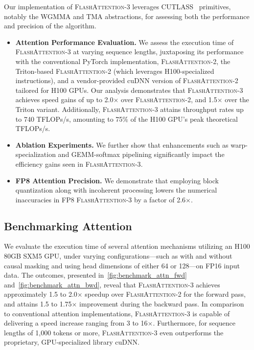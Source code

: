 Our implementation of \textsc{FlashAttention-3} leverages CUTLASS~\citep{Thakkar_CUTLASS_2023} primitives, notably the WGMMA and TMA abstractions, for assessing both the performance and precision of the algorithm.

\begin{itemize}

\item \textbf{Attention Performance Evaluation.} We assess the execution time of \textsc{FlashAttention-3} at varying sequence lengths, juxtaposing its performance with the conventional PyTorch implementation, \textsc{FlashAttention-2}, the Triton-based \textsc{FlashAttention-2} (which leverages H100-specialized instructions), and a vendor-provided cuDNN version of \textsc{FlashAttention-2} tailored for H100 GPUs. Our analysis demonstrates that \textsc{FlashAttention-3} achieves speed gains of up to 2.0$\times$ over \textsc{FlashAttention-2}, and 1.5$\times$ over the Triton variant. Additionally, \textsc{FlashAttention-3} attains throughput rates up to 740 TFLOPs/s, amounting to 75\% of the H100 GPU's peak theoretical TFLOPs/s.
\item \textbf{Ablation Experiments.} We further show that enhancements such as warp-specialization and GEMM-softmax pipelining significantly impact the efficiency gains seen in \textsc{FlashAttention-3}.
\item \textbf{FP8 Attention Precision.} We demonstrate that employing block quantization along with incoherent processing lowers the numerical inaccuracies in FP8 \textsc{FlashAttention-3} by a factor of 2.6$\times$.
\end{itemize}

\subsection{Benchmarking Attention}
\label{subsec:benchmark_attn}

We evaluate the execution time of several attention mechanisms utilizing an H100 80GB SXM5 GPU, under varying configurations—such as with and without causal masking and using head dimensions of either 64 or 128—on FP16 input data. The outcomes, presented in~\cref{fig:benchmark_attn_fwd} and~\cref{fig:benchmark_attn_bwd}, reveal that \textsc{FlashAttention-3} achieves approximately 1.5 to 2.0$\times$ speedup over \textsc{FlashAttention-2} for the forward pass, and attains 1.5 to 1.75$\times$ improvement during the backward pass. In comparison to conventional attention implementations, \textsc{FlashAttention-3} is capable of delivering a speed increase ranging from 3 to 16$\times$. Furthermore, for sequence lengths of 1,000 tokens or more, \textsc{FlashAttention-3} even outperforms the proprietary, GPU-specialized library cuDNN.

